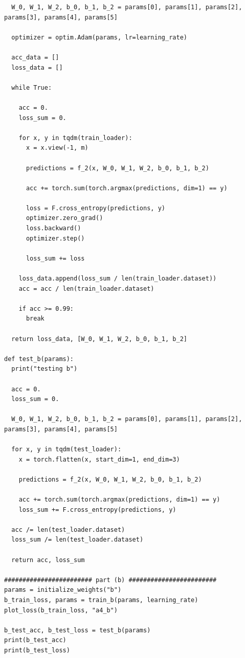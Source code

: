 \documentclass{article}
\newcommand{\1}{\mathbf{1}}
\begin{document}
{\begin{verbatim}
  W_0, W_1, W_2, b_0, b_1, b_2 = params[0], params[1], params[2], params[3], params[4], params[5]

  optimizer = optim.Adam(params, lr=learning_rate)
    
  acc_data = []
  loss_data = []

  while True:

    acc = 0.
    loss_sum = 0.

    for x, y in tqdm(train_loader):
      x = x.view(-1, m)

      predictions = f_2(x, W_0, W_1, W_2, b_0, b_1, b_2)

      acc += torch.sum(torch.argmax(predictions, dim=1) == y)

      loss = F.cross_entropy(predictions, y)
      optimizer.zero_grad()
      loss.backward()
      optimizer.step()

      loss_sum += loss
    
    loss_data.append(loss_sum / len(train_loader.dataset))
    acc = acc / len(train_loader.dataset)
    
    if acc >= 0.99:
      break
  
  return loss_data, [W_0, W_1, W_2, b_0, b_1, b_2]

def test_b(params):
  print("testing b")

  acc = 0.
  loss_sum = 0.
  
  W_0, W_1, W_2, b_0, b_1, b_2 = params[0], params[1], params[2], params[3], params[4], params[5]
  
  for x, y in tqdm(test_loader):
    x = torch.flatten(x, start_dim=1, end_dim=3)

    predictions = f_2(x, W_0, W_1, W_2, b_0, b_1, b_2)

    acc += torch.sum(torch.argmax(predictions, dim=1) == y)
    loss_sum += F.cross_entropy(predictions, y)
  
  acc /= len(test_loader.dataset)
  loss_sum /= len(test_loader.dataset)

  return acc, loss_sum

######################## part (b) ########################
params = initialize_weights("b")
b_train_loss, params = train_b(params, learning_rate)
plot_loss(b_train_loss, "a4_b")

b_test_acc, b_test_loss = test_b(params)
print(b_test_acc)
print(b_test_loss)

\end{verbatim}

}
\end{document}
